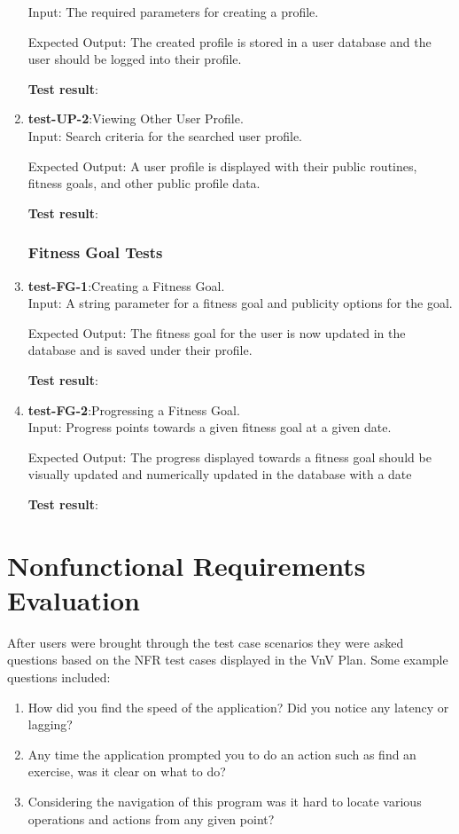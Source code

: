 \documentclass[12pt, titlepage]{article}
\begin{document}
\begin{enumerate}
	Input: The required parameters for creating a profile.
	
	Expected Output: The created profile is stored in a user database and the user should be logged into their profile.
	
	\textbf{Test result}:
	
	\item{\textbf{test-UP-2}}:Viewing Other User Profile.\\
	
	Input: Search criteria for the searched user profile.
	
	Expected Output: A user profile is displayed with their public routines, fitness goals, and other public profile data.
	
	\textbf{Test result}:
	
\subsubsection{Fitness Goal Tests}
	\item{\textbf{test-FG-1}}:Creating a Fitness Goal.\\
	
	Input: A string parameter for a fitness goal and publicity options for the goal.
	
	Expected Output: The fitness goal for the user is now updated in the database and is saved under their profile.
	
	\textbf{Test result}:
	
	\item{\textbf{test-FG-2}}:Progressing a Fitness Goal.\\
	
	Input: Progress points towards a given fitness goal at a given date.
	
	Expected Output: The progress displayed towards a fitness goal should be visually updated and numerically updated in the database with a date
	
	\textbf{Test result}:
	
	
\end{enumerate}
\section{Nonfunctional Requirements Evaluation}

\noindent After users were brought through the test case scenarios they were asked questions based on the NFR test cases displayed in the VnV Plan.
Some example questions included: \\
\begin{enumerate}
	\item How did you find the speed of the application? Did you notice any latency or lagging?
	\item Any time the application prompted you to do an action such as find an exercise, was it clear on what to do?
	\item Considering the navigation of this program was it hard to locate various operations and actions from any given point?
\end{enumerate}
\end{document}

